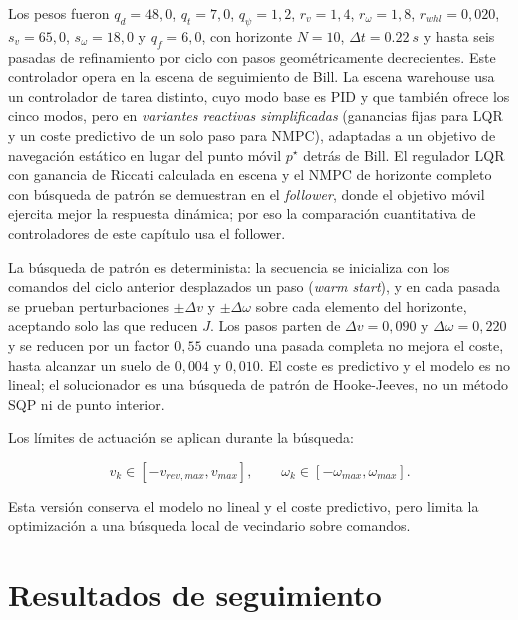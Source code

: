 Los pesos fueron
\(q_d=48{,}0\), \(q_t=7{,}0\), \(q_\psi=1{,}2\),
\(r_v=1{,}4\), \(r_\omega=1{,}8\), \(r_{whl}=0{,}020\),
\(s_v=65{,}0\), \(s_\omega=18{,}0\) y \(q_f=6{,}0\), con horizonte
\(N=10\), \(\Delta t=\SI{0.22}{s}\) y hasta seis pasadas de refinamiento por
ciclo con pasos geométricamente decrecientes.
Este controlador opera en la escena de seguimiento de Bill. La escena warehouse
usa un controlador de tarea distinto, cuyo modo base es PID y que
también ofrece los cinco modos, pero en \emph{variantes reactivas simplificadas}
(ganancias fijas para LQR y un coste predictivo de un solo paso para NMPC),
adaptadas a un objetivo de navegación estático en lugar del punto móvil
\(p^\star\) detrás de Bill. El regulador LQR con ganancia de Riccati calculada en
escena y el NMPC de horizonte completo con búsqueda de patrón se demuestran en el
\emph{follower}, donde el objetivo móvil ejercita mejor la respuesta dinámica; por
eso la comparación cuantitativa de controladores de este capítulo usa el follower.

La búsqueda de patrón es determinista: la secuencia se inicializa con los
comandos del ciclo anterior desplazados un paso (\emph{warm start}), y en cada
pasada se prueban perturbaciones \(\pm\Delta v\) y \(\pm\Delta\omega\) sobre cada
elemento del horizonte, aceptando solo las que reducen \(J\). Los pasos parten
de \(\Delta v=0{,}090\) y \(\Delta\omega=0{,}220\) y se reducen por un factor
\(0{,}55\) cuando una pasada completa no mejora el coste, hasta alcanzar un suelo
de \(0{,}004\) y \(0{,}010\). El coste es predictivo y el modelo es no lineal;
el solucionador es una búsqueda de patrón de Hooke-Jeeves, no un método SQP ni
de punto interior.

Los límites de actuación se aplican durante la búsqueda:

\[
v_k\in[-v_{rev,max},v_{max}],
\qquad
\omega_k\in[-\omega_{max},\omega_{max}].
\]

Esta versión conserva el modelo no lineal y el coste predictivo, pero limita la
optimización a una búsqueda local de vecindario sobre comandos.

\section{Resultados de seguimiento}

